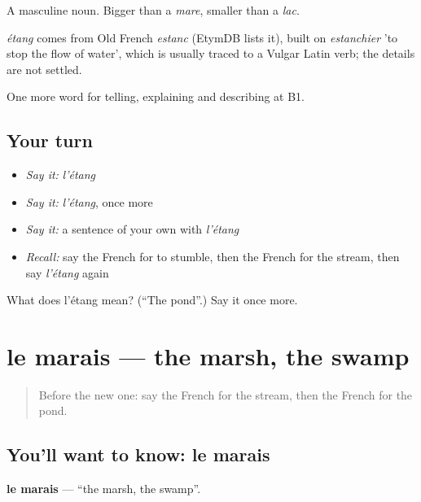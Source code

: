 A masculine noun. Bigger than a \emph{mare}, smaller than a \emph{lac}.

\begin{cousinweb}
\emph{étang} comes from Old French \emph{estanc} (EtymDB lists it), built on \emph{estanchier} 'to stop the flow of water', which is usually traced to a Vulgar Latin verb; the details are not settled.
\end{cousinweb}

\begin{grammarlens}[title={What you've built}]
One more word for telling, explaining and describing at B1.
\end{grammarlens}

\subsection*{Your turn}
\begin{itemize}
\raggedright
  \item \emph{Say it:} \emph{l'étang}
  \item \emph{Say it:} \emph{l'étang}, once more
  \item \emph{Say it:} a sentence of your own with \emph{l'étang}
  \item \emph{Recall:} say the French for to stumble, then the French for the stream, then say \emph{l'étang} again
\end{itemize}

\begin{tcolorbox}[breakable,colback=teal!4,colframe=teal!35!black,title={Before you move on}]
What does l'étang mean? (\textquotedblleft{}The pond\textquotedblright{}.) Say it once more.
\end{tcolorbox}
\section[le marais]{le marais — the marsh, the swamp}

\label{lesson:FR-C456-marais}



\begin{quote}
Before the new one: say the French for the stream, then the French for the pond.
\end{quote}

\subsection*{You'll want to know: le marais}
\textbf{le marais} — \textquotedblleft{}the marsh, the swamp\textquotedblright{}.

